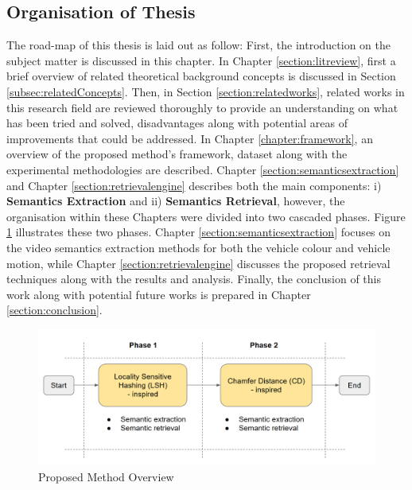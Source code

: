 \subsection{Organisation of Thesis}

The road-map of this thesis is laid out as follow: First, the introduction on the subject matter is discussed in this chapter.
In Chapter \ref{section:litreview}, first a brief overview of related theoretical background concepts is discussed in Section \ref{subsec:relatedConcepts}. Then, in Section \ref{section:relatedworks}, related works in this research field are reviewed thoroughly to provide an understanding on what has been tried and solved, disadvantages along with potential areas of improvements that could be addressed.
In Chapter \ref{chapter:framework}, an overview of the proposed method's framework, dataset along with the experimental methodologies are described.
Chapter \ref{section:semanticsextraction} and Chapter \ref{section:retrievalengine} describes both the main components: i) \textbf{Semantics Extraction} and ii) \textbf{Semantics Retrieval}, however, the organisation within these Chapters were divided into two cascaded phases.
Figure \ref{fig:proposedmethodoverview} illustrates these two phases.
Chapter \ref{section:semanticsextraction} focuses on the video semantics extraction methods for both the vehicle colour and vehicle motion, while Chapter \ref{section:retrievalengine} discusses the proposed retrieval techniques along with the results and analysis.
Finally, the conclusion of this work along with potential future works is prepared in Chapter \ref{section:conclusion}.



\begin{figure}[!hbt]\centering
\includegraphics[width=\textwidth]{image/general/phases.PNG}
\caption{Proposed Method Overview}
\label{fig:proposedmethodoverview}
\end{figure}
